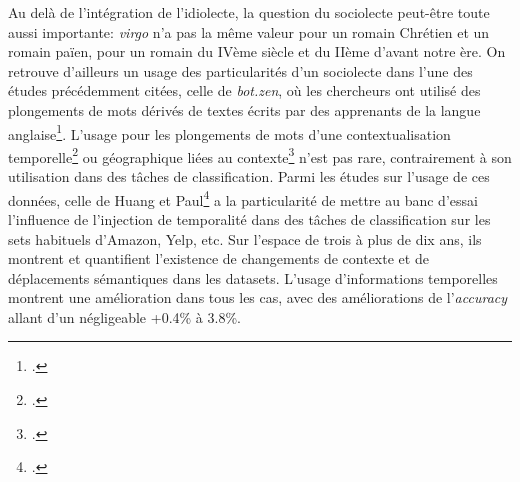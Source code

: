 Au delà de l'intégration de l'idiolecte, la question du sociolecte peut-être toute aussi importante: \textit{virgo} n'a pas la même valeur pour un romain Chrétien et un romain païen, pour un romain du IVème siècle et du IIème d'avant notre ère. On retrouve d'ailleurs un usage des particularités d'un sociolecte dans l'une des études précédemment citées, celle de \textit{bot.zen}, où les chercheurs ont utilisé des plongements de mots dérivés de textes écrits par des apprenants de la langue anglaise\footcite{stemle_using_2018}. L'usage pour les plongements de mots d'une contextualisation temporelle\footcite{carlo_training_2019} ou géographique liées au contexte\footcite{gong_enriching_2020} n'est pas rare, contrairement à son utilisation dans des tâches de classification. Parmi les études sur l'usage de ces données, celle de Huang et Paul\footcite{huang_neural_2019} a la particularité de mettre au banc d'essai l'influence de l'injection de temporalité dans des tâches de classification sur les sets habituels d'Amazon, Yelp, etc. Sur l'espace de trois à plus de dix ans, ils montrent et quantifient l'existence de changements de contexte et de déplacements sémantiques dans les datasets. L'usage d'informations temporelles montrent une amélioration dans tous les cas, avec des améliorations de l'\textit{accuracy} allant d'un négligeable +0.4\% à 3.8\%.

